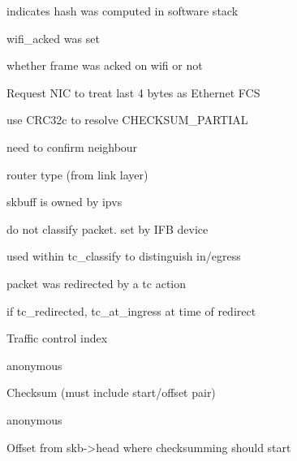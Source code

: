 \documentclass[a4paper,8pt,english]{sphinxmanual}
\begin{document}
\begin{description}
\item[{}] \leavevmode
indicates hash was computed in software stack

\item[{}] \leavevmode
wifi\_acked was set

\item[{}] \leavevmode
whether frame was acked on wifi or not

\item[{}] \leavevmode
Request NIC to treat last 4 bytes as Ethernet FCS

\item[{}] \leavevmode
use CRC32c to resolve CHECKSUM\_PARTIAL

\item[{}] \leavevmode
need to confirm neighbour

\item[{}] \leavevmode
router type (from link layer)

\item[{}] \leavevmode
skbuff is owned by ipvs

\item[{}] \leavevmode
do not classify packet. set by IFB device

\item[{}] \leavevmode
used within tc\_classify to distinguish in/egress

\item[{}] \leavevmode
packet was redirected by a tc action

\item[{}] \leavevmode
if tc\_redirected, tc\_at\_ingress at time of redirect

\item[{}] \leavevmode
Traffic control index

\item[{}] \leavevmode
anonymous

\item[{}] \leavevmode
Checksum (must include start/offset pair)

\item[{}] \leavevmode
anonymous

\item[{}] \leavevmode
Offset from skb-\textgreater{}head where checksumming should start


\end{description}
\end{document}
